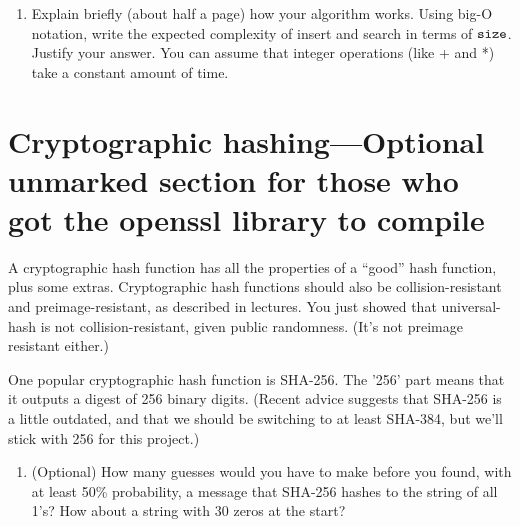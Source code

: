 \documentclass[11pt]{article}
\newcommand{\size}{{\tt size}}
\begin{document}
\begin{enumerate}[resume]
\item
    Explain briefly (about half a page) how your algorithm works.  Using big-O notation, write the expected complexity of insert and search in terms of $\size$.
        Justify your answer.
        You can assume that integer operations (like + and *) take a constant amount of time.
\end{enumerate}

\section*{Cryptographic hashing---Optional unmarked section for those who got the openssl library to compile}
A cryptographic hash function has all the properties of a ``good'' hash function, plus some extras.
Cryptographic hash functions should also be collision-resistant and preimage-resistant,
as described in lectures.
You just showed that  universal-hash is not collision-resistant, given public randomness.
(It's not preimage resistant either.)

One popular cryptographic hash function is SHA-256.
The '256' part means that it outputs a digest of 256 binary digits.
(Recent advice suggests that SHA-256 is a little outdated,
and that we should be switching to at least SHA-384,
but we'll stick with 256 for this project.)

\begin{enumerate}[resume]
\item (Optional) How many guesses would you have to make before you found, with at least
    50\% probability, a message that SHA-256 hashes to the string of all 1's?
        How about a string with 30 zeros at the start?
\end{enumerate}
\end{document}
